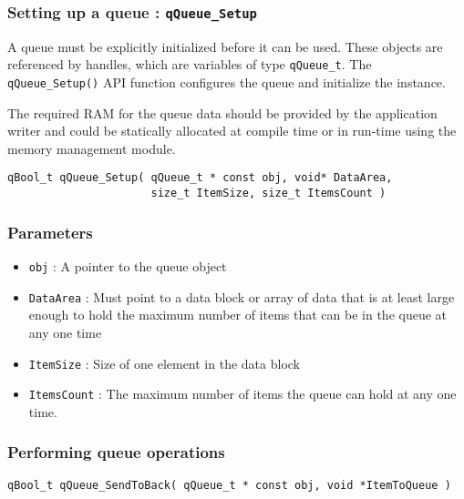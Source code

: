 

\subsubsection{Setting up a queue : \texorpdfstring{\lstinline{qQueue_Setup}}{qQueue_Setup} }  \label{queuecreate}
A queue must be explicitly initialized before it can be used. 
\medskip
These objects are referenced by handles, which are variables of type \lstinline{qQueue_t}. The \lstinline{qQueue_Setup()} API function configures the queue and initialize the instance. 

The required RAM for the queue data should be provided by the application writer and could be statically allocated at compile time or in run-time using the memory management module.
\medskip
 
\begin{lstlisting}[style=CStyle]
qBool_t qQueue_Setup( qQueue_t * const obj, void* DataArea, 
                      size_t ItemSize, size_t ItemsCount )
\end{lstlisting}

\subsubsection*{Parameters}
\begin{itemize}
    \item \lstinline{obj} : A pointer to the queue object
    \item \lstinline{DataArea} : Must point to a data block or array of data that is at least large enough to hold the maximum number of items that can be in the queue at any one time
    \item \lstinline{ItemSize} : Size of one element in the data block
    \item \lstinline{ItemsCount} : The maximum number of items the queue can hold at any one time.
\end{itemize}      
    
\subsubsection{Performing queue operations}
\begin{lstlisting}[style=CStyle]
qBool_t qQueue_SendToBack( qQueue_t * const obj, void *ItemToQueue )
\end{lstlisting}

